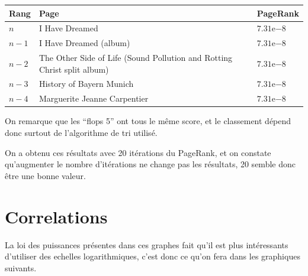\documentclass{report}
\begin{document}
\begin{center}
  \begin{tabular}{|l|l|l|}
    \hline
    Rang & Page & PageRank\\
    \hline
    $n$ & I Have Dreamed & $7.31\mathrm{e}{-8}$\\
    $n-1$ & I Have Dreamed (album) & $7.31\mathrm{e}{-8}$\\
    $n-2$ & The Other Side of Life (Sound Pollution and Rotting Christ split album) & $7.31\mathrm{e}{-8}$\\
    $n-3$ & History of Bayern Munich & $7.31\mathrm{e}{-8}$\\
    $n-4$ & Marguerite Jeanne Carpentier & $7.31\mathrm{e}{-8}$\\
    \hline
  \end{tabular}
\end{center}
On remarque que les ``flops 5'' ont tous le même score, et le classement dépend donc surtout de l'algorithme de tri utilisé.

On a obtenu ces résultats avec 20 itérations du PageRank, et on constate qu'augmenter le nombre d'itérations ne change pas les résultats, 20 semble donc être une bonne valeur.

\section{Correlations}

La loi des puissances présentes dans ces graphes fait qu'il est plus intéressants d'utiliser des echelles logarithmiques, c'est donc ce qu'on fera dans les graphiques suivants.
\end{document}
